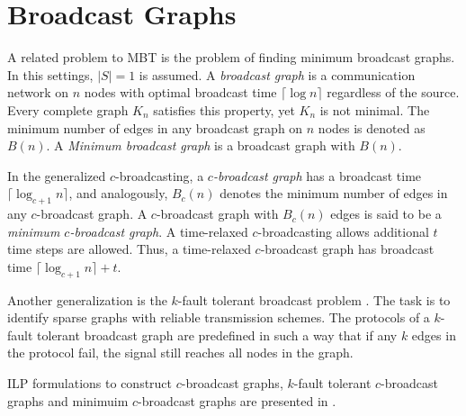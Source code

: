 

\section{Broadcast Graphs}

A related problem to MBT is the problem of finding minimum broadcast graphs.
In this settings, $|S|=1$ is assumed.
A \emph{broadcast graph} is a communication network on $n$ nodes with optimal broadcast time $\lceil \log n\rceil$ regardless of the source.
Every complete graph $K_n$ satisfies this property, yet $K_n$ is not minimal. 
The minimum number of edges in any broadcast graph on $n$ nodes is denoted as $B(n)$.
A \emph{Minimum broadcast graph} is a broadcast graph with $B(n)$.

In the generalized $c$-broadcasting, a \emph{$c$-broadcast graph} has a broadcast time $\lceil \log_{c+1} n\rceil$, and analogously, 
$B_c(n)$ denotes the minimum number of edges in any $c$-broadcast graph.
A $c$-broadcast graph with $B_c(n)$ edges is said to be a \emph{minimum $c$-broadcast graph}.
A time-relaxed $c$-broadcasting \cite{mcgarvey16} allows additional $t$ time steps are allowed.
Thus, a time-relaxed $c$-broadcast graph has broadcast time $\lceil \log_{c+1} n\rceil+t$.

Another generalization is the $k$-fault tolerant broadcast problem \cite{liestman85}.
The task is to identify sparse graphs with reliable transmission schemes.
The protocols of a $k$-fault tolerant broadcast graph are predefined in such a way that if any $k$ edges in the protocol fail, the signal still reaches all nodes in the graph.

ILP formulations to construct $c$-broadcast graphs, $k$-fault tolerant $c$-broadcast graphs and minimuim $c$-broadcast graphs are presented in \cite{mcgarvey16}.


